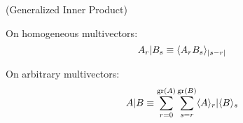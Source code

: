 \begin{definition}[]
	(Generalized Inner Product)
	
	On homogeneous multivectors:
	\[A_r | B_s \equiv \langle A_rB_s \rangle_{\left|s-r\right|}\]
	
	On arbitrary multivectors:
	\[A | B \equiv \sum_{r=0}^{\mathrm{gr}\left(A\right)}\sum_{s=r}^{\mathrm{gr}\left(B\right)} \langle A \rangle_{r} | \langle B \rangle_{s}\]
\end{definition}
